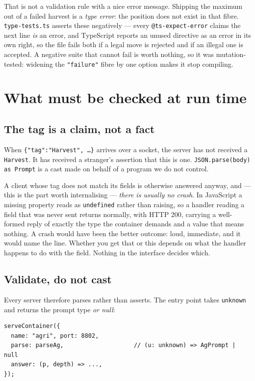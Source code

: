 \documentclass[11pt,a4paper]{article}
\begin{document}
\noindent That is not a validation rule with a nice error message. Shipping the
maximum out of a failed harvest is a \emph{type error}: the position does not
exist in that fibre. \texttt{type-tests.ts} asserts these negatively --- every
\texttt{@ts-expect-error} claims the next line \emph{is} an error, and
TypeScript reports an unused directive as an error in its own right, so the
file fails both if a legal move is rejected and if an illegal one is accepted.
A negative suite that cannot fail is worth nothing, so it was mutation-tested:
widening the \texttt{"failure"} fibre by one option makes it stop compiling.

\section{What must be checked at run time}

\subsection{The tag is a claim, not a fact}

When \texttt{\{"tag":"Harvest", \dots\}} arrives over a socket, the server has
not received a \texttt{Harvest}. It has received a stranger's assertion that
this is one. \texttt{JSON.parse(body) as Prompt} is a cast made on behalf of a
program we do not control.

A client whose tag does not match its fields is otherwise answered anyway, and
--- this is the part worth internalising --- \emph{there is usually no crash}.
In JavaScript a missing property reads as \texttt{undefined} rather than
raising, so a handler reading a field that was never sent returns normally,
with HTTP 200, carrying a well-formed reply of exactly the type the container
demands and a value that means nothing. A crash would have been the better
outcome: loud, immediate, and it would name the line. Whether you get that or
this depends on what the handler happens to do with the field. Nothing in the
interface decides which.

\subsection{Validate, do not cast}

Every server therefore parses rather than asserts. The entry point takes
\texttt{unknown} and returns the prompt type \emph{or null}:

\begin{lstlisting}
serveContainer({
  name: "agri", port: 8802,
  parse: parseAg,                    // (u: unknown) => AgPrompt | null
  answer: (p, depth) => ...,
});
\end{lstlisting}
\end{document}
